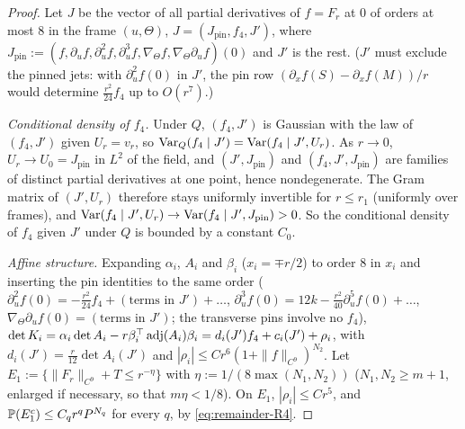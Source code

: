 \begin{proof}
Let $J$ be the vector of all partial derivatives of $f=F_r$ at $0$ of orders at most $8$ in the frame $(u,\Theta)$, $J=(J_{\mathrm{pin}},f_4,J')$, where $J_{\mathrm{pin}}:=(f,\partial_uf,\partial_u^2f,\partial_u^3f,\nabla_\Theta f,\nabla_\Theta\partial_uf)(0)$ and $J'$ is the rest. ($J'$ must exclude the pinned jets: with $\partial_u^2f(0)$ in $J'$, the pin row $(\partial_xf(S)-\partial_xf(M))/r$ would determine $\frac{r^2}{24}f_4$ up to $O(r^7)$.)

\emph{Conditional density of $f_4$.} Under $Q$, $(f_4,J')$ is Gaussian with the law of $(f_4,J')$ given $U_r=v_r$, so $\operatorname{Var}_Q(f_4\mid J')=\operatorname{Var}(f_4\mid J',U_r)$. As $r\to0$, $U_r\to U_0=J_{\mathrm{pin}}$ in $L^2$ of the field, and $(J',J_{\mathrm{pin}})$ and $(f_4,J',J_{\mathrm{pin}})$ are families of distinct partial derivatives at one point, hence nondegenerate. The Gram matrix of $(J',U_r)$ therefore stays uniformly invertible for $r\le r_1$ (uniformly over frames), and $\operatorname{Var}(f_4\mid J',U_r)\to\operatorname{Var}(f_4\mid J',J_{\mathrm{pin}})>0$. So the conditional density of $f_4$ given $J'$ under $Q$ is bounded by a constant $C_0$.

\emph{Affine structure.} Expanding $\alpha_i$, $A_i$ and $\beta_i$ ($x_i=\mp r/2$) to order $8$ in $x_i$ and inserting the pin identities to the same order ($\partial_u^2f(0)=-\frac{r^2}{24}f_4+(\text{terms in }J')+\dots$, $\partial_u^3f(0)=12k-\frac{r^2}{40}\partial_u^5f(0)+\dots$, $\nabla_\Theta\partial_uf(0)=(\text{terms in }J')$; the transverse pins involve no $f_4$), $\det K_i=\alpha_i\det A_i-r\beta_i^{\top}\operatorname{adj}(A_i)\beta_i=d_i(J')f_4+c_i(J')+\rho_i$, with $d_i(J')=\frac r{12}\det A_i(J')$ and $|\rho_i|\le Cr^6(1+\|f\|_{C^9})^{N_2}$. Let $E_1:=\{\|F_r\|_{C^9}+T\le r^{-\eta}\}$ with $\eta:=1/(8\max(N_1,N_2))$ ($N_1,N_2\ge m+1$, enlarged if necessary, so that $m\eta<1/8$). On $E_1$, $|\rho_i|\le Cr^5$, and $\mathbb P(E_1^c)\le C_qr^qP^{N_q}$ for every $q$, by \eqref{eq:remainder-R4}.


\end{proof}
